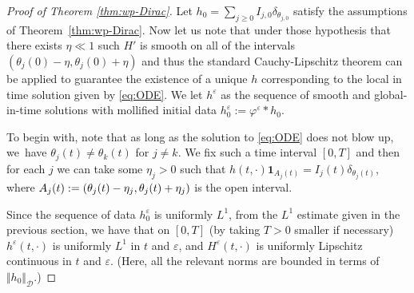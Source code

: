 \documentclass[10pt]{amsart}
\theoremstyle{plain}
\theoremstyle{definition}
\newcommand{\nrm}[1]{\Vert#1\Vert}
\let\dlt\delta
\let\tht\theta
\let\varep\varepsilon
\newcommand{\calD}{\mathcal D}
\begin{document}
\begin{proof}[Proof of Theorem \ref{thm:wp-Dirac}]
Let $h_0 = \sum_{j\ge0} I_{j,0}\dlt_{\tht_{j,0}}$ satisfy the assumptions of Theorem~\ref{thm:wp-Dirac}. Now let us note that under those hypothesis that there exists $\eta\ll1 $ such $H'$ is smooth on all of the intervals $\left(\theta_j(0)-\eta,\theta_j(0)+\eta\right)$ and thus the standard Cauchy-Lipschitz theorem can be applied to guarantee the existence of a unique $h$ corresponding to the local in time solution given by \eqref{eq:ODE}. We let $h^\varep$ as the sequence of smooth and global-in-time solutions with mollified initial data $h^\varep_0 := \varphi^\varep * h_0$.

To begin with, note that as long as the solution to \eqref{eq:ODE} does not blow up, we~have $\tht_{j}(t) \ne \tht_{k}(t)$ for $j\ne k$. We fix such a time interval $[0,T]$ and then for each $j$ we can take some $\eta_{j}>0$ such that $h(t,\cdot) \mathbf{1}_{A_{j}(t)} = I_{j}(t) \dlt_{\tht_j(t)}$, where $A_{j}(t):= (\tht_{j}(t) -\nobreak \eta_{j}, \tht_{j}(t)+\nobreak\eta_{j})$ is the open interval.

Since the sequence of data $h_0^{\varep}$ is uniformly $L^1$, from the $L^1$ estimate given in the previous section, we have that on $[0,T]$ (by taking $T>0$ smaller if necessary) $h^\varep(t,\cdot)$ is uniformly $L^1$ in $t$ and $\varep$, and $H^{\varep}(t,\cdot)$ is uniformly Lipschitz continuous in $t$ and $\varep$. (Here, all the relevant norms are bounded in terms of $\nrm{h_0}_{\calD}$.)


\end{proof}
\end{document}
